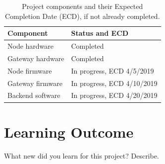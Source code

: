 \documentclass{IEEEtran}
\begin{document}
\begin{table}[h!]
    \centering
    \begin{tabular}{l|l}
    Component & Status and ECD \\
    \hline
    \hline
    Node hardware     &  Completed \\
    Gateway hardware  &  Completed \\
    Node firmware     & In progress, ECD 4/5/2019 \\
    Gateway firmware  & In progress, ECD 4/10/2019 \\
    Backend software  & In progress, ECD 4/20/2019
    \end{tabular}
    \vspace{2mm}
    \caption{Project components and their Expected Completion Date (ECD), if not already completed. }
    \label{tab:schedule}
\end{table}



\section{Learning Outcome}

What new did you learn for this project? Describe.





\end{document}
